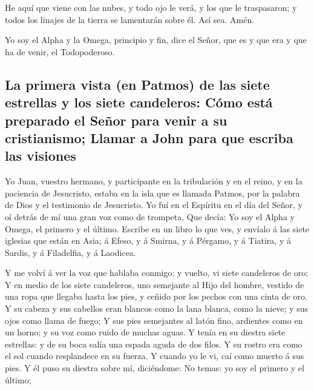  He aquí que viene con las nubes, y todo ojo le verá, y
los que le traspasaron; y todos los linajes de la tierra se lamentarán
sobre él. Así sea. Amén.

 Yo soy el Alpha y la Omega, principio y fin, dice el
Señor, que es y que era y que ha de venir, el Todopoderoso.

\hypertarget{la-primera-vista-en-patmos-de-las-siete-estrellas-y-los-siete-candeleros-cuxf3mo-estuxe1-preparado-el-seuxf1or-para-venir-a-su-cristianismo-llamar-a-john-para-que-escriba-las-visiones}{%
\subsection{La primera vista (en Patmos) de las siete estrellas y los
siete candeleros: Cómo está preparado el Señor para venir a su
cristianismo; Llamar a John para que escriba las
visiones}\label{la-primera-vista-en-patmos-de-las-siete-estrellas-y-los-siete-candeleros-cuxf3mo-estuxe1-preparado-el-seuxf1or-para-venir-a-su-cristianismo-llamar-a-john-para-que-escriba-las-visiones}}

 Yo Juan, vuestro hermano, y participante en la
tribulación y en el reino, y en la paciencia de Jesucristo, estaba en la
isla que es llamada Patmos, por la palabra de Dios y el testimonio de
Jesucristo.  Yo fuí en el Espíritu en el día del Señor, y
oí detrás de mí una gran voz como de trompeta,  Que
decía: Yo soy el Alpha y Omega, el primero y el último. Escribe en un
libro lo que ves, y envíalo á las siete iglesias que están en Asia; á
Efeso, y á Smirna, y á Pérgamo, y á Tiatira, y á Sardis, y á Filadelfia,
y á Laodicea.

 Y me volví á ver la voz que hablaba conmigo: y vuelto,
vi siete candeleros de oro;  Y en medio de los siete
candeleros, uno semejante al Hijo del hombre, vestido de una ropa que
llegaba hasta los pies, y ceñido por los pechos con una cinta de oro.
 Y su cabeza y sus cabellos eran blancos como la lana
blanca, como la nieve; y sus ojos como llama de fuego;  Y
sus pies semejantes al latón fino, ardientes como en un horno; y su voz
como ruido de muchas aguas.  Y tenía en su diestra siete
estrellas: y de su boca salía una espada aguda de dos filos. Y su rostro
era como el sol cuando resplandece en su fuerza.  Y
cuando yo le vi, caí como muerto á sus pies. Y él puso su diestra sobre
mí, diciéndome: No temas: yo soy el primero y el último;

